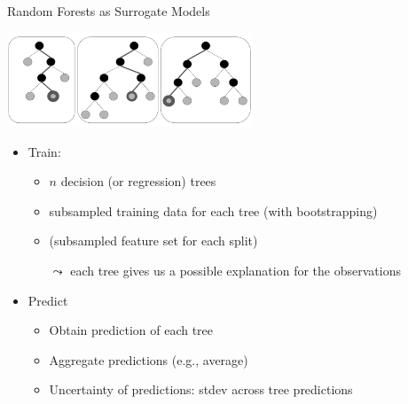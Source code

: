 \begin{frame}[c,fragile]{Random Forests as Surrogate Models}


\centering
\includegraphics[width=0.55\textwidth]{images/random_forest_pic}

\begin{itemize}
\item Train:
\begin{itemize}
	\item $n$ decision (or regression) trees
	\item subsampled training data for each tree (with bootstrapping)
	\item (subsampled feature set for each split)
	\pause
	\item[$\leadsto$] each tree gives us a possible explanation for the observations
\end{itemize}

\pause

\item Predict
\begin{itemize}
	\item Obtain prediction of each tree
	\item Aggregate predictions (e.g., average)
	\pause
	\item Uncertainty of predictions: stdev across tree predictions 
\end{itemize}
\end{itemize}


\end{frame}

